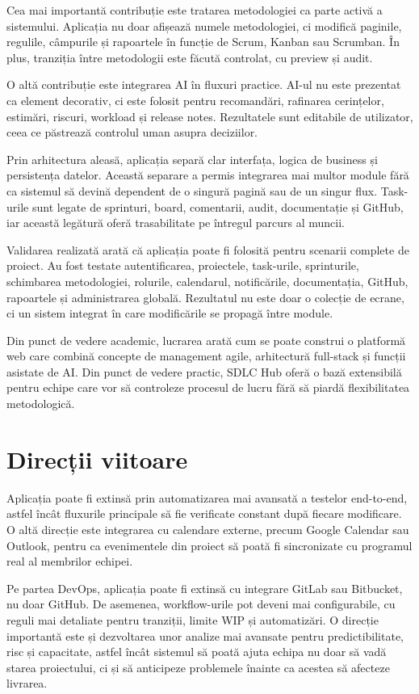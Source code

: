 \documentclass[12pt,a4paper]{report}
\begin{document}
Cea mai importantă contribuție este tratarea metodologiei ca parte activă a sistemului. Aplicația nu doar afișează numele metodologiei, ci modifică paginile, regulile, câmpurile și rapoartele în funcție de Scrum, Kanban sau Scrumban. În plus, tranziția între metodologii este făcută controlat, cu preview și audit.

O altă contribuție este integrarea AI în fluxuri practice. AI-ul nu este prezentat ca element decorativ, ci este folosit pentru recomandări, rafinarea cerințelor, estimări, riscuri, workload și release notes. Rezultatele sunt editabile de utilizator, ceea ce păstrează controlul uman asupra deciziilor.

Prin arhitectura aleasă, aplicația separă clar interfața, logica de business și persistența datelor. Această separare a permis integrarea mai multor module fără ca sistemul să devină dependent de o singură pagină sau de un singur flux. Task-urile sunt legate de sprinturi, board, comentarii, audit, documentație și GitHub, iar această legătură oferă trasabilitate pe întregul parcurs al muncii.

Validarea realizată arată că aplicația poate fi folosită pentru scenarii complete de proiect. Au fost testate autentificarea, proiectele, task-urile, sprinturile, schimbarea metodologiei, rolurile, calendarul, notificările, documentația, GitHub, rapoartele și administrarea globală. Rezultatul nu este doar o colecție de ecrane, ci un sistem integrat în care modificările se propagă între module.

Din punct de vedere academic, lucrarea arată cum se poate construi o platformă web care combină concepte de management agile, arhitectură full-stack și funcții asistate de AI. Din punct de vedere practic, SDLC Hub oferă o bază extensibilă pentru echipe care vor să controleze procesul de lucru fără să piardă flexibilitatea metodologică.

\section{Direcții viitoare}
Aplicația poate fi extinsă prin automatizarea mai avansată a testelor end-to-end, astfel încât fluxurile principale să fie verificate constant după fiecare modificare. O altă direcție este integrarea cu calendare externe, precum Google Calendar sau Outlook, pentru ca evenimentele din proiect să poată fi sincronizate cu programul real al membrilor echipei.

Pe partea DevOps, aplicația poate fi extinsă cu integrare GitLab sau Bitbucket, nu doar GitHub. De asemenea, workflow-urile pot deveni mai configurabile, cu reguli mai detaliate pentru tranziții, limite WIP și automatizări. O direcție importantă este și dezvoltarea unor analize mai avansate pentru predictibilitate, risc și capacitate, astfel încât sistemul să poată ajuta echipa nu doar să vadă starea proiectului, ci și să anticipeze problemele înainte ca acestea să afecteze livrarea.
\end{document}
